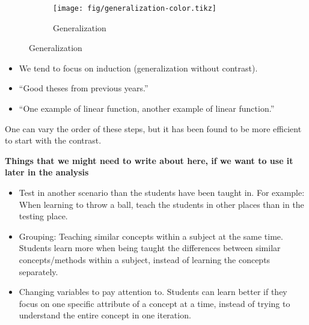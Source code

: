 \begin{frame}
  \begin{figure}
    \hfill
    \begin{subfigure}{0.3\columnwidth}
      \centering
      \texttt{[image: fig/generalization-color.tikz]}
      \caption{Generalization}
    \end{subfigure}
    \hfill
  \end{figure}

  \begin{remark}
    \begin{itemize}
      \item We tend to focus on induction (\ie generalization without 
        contrast).
      \item \enquote{Good theses from previous years.}
      \item \enquote{One example of linear function, another example of linear 
        function.}
    \end{itemize}
  \end{remark}
\end{frame}

One can vary the order of these steps, but it has been found to be more 
efficient to start with the contrast.

\textbf{Things that we might need to write about here, if we want to use it 
later in the analysis}

\begin{itemize}
    \item Test in another scenario than the students have been taught in. 
For example: When learning to throw a ball, teach the students in other 
places than in the testing place.
    \item Grouping: Teaching similar concepts within a subject at the same 
time. Students learn more when being taught the differences between 
similar concepts/methods within a subject, instead of learning the 
concepts separately.
    \item Changing variables to pay attention to. Students can learn better 
if they focus on one specific attribute of a concept at a time, instead 
of trying to understand the entire concept in one iteration.
\end{itemize}









